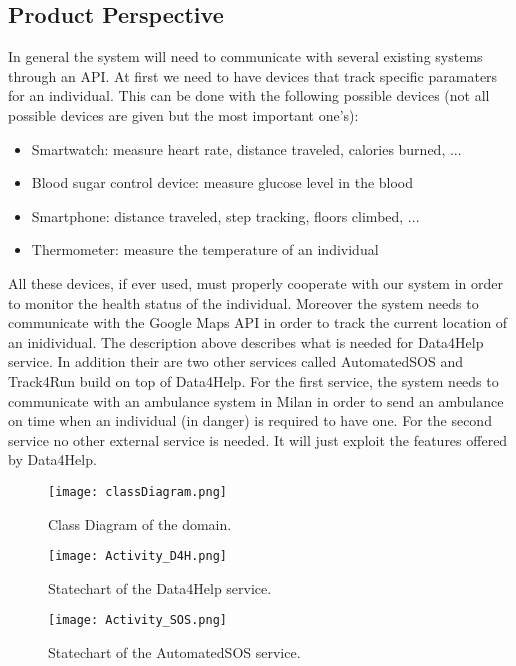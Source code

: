 \documentclass[12pt]{article}
\begin{document}
\subsection{Product Perspective}
In general the system will need to communicate with several existing systems through an API. At first we need to have devices that track specific paramaters for an individual. This can be done with the following possible devices (not all possible devices are given but the most important one's): 
\begin{itemize}
    \item Smartwatch: measure heart rate, distance traveled, calories burned, ...
    \item Blood sugar control device: measure glucose level in the blood
    \item Smartphone: distance traveled, step tracking, floors climbed, ...
    \item Thermometer: measure the temperature of an individual
\end{itemize}
All these devices, if ever used, must properly cooperate with our system in order to monitor the health status of the individual. Moreover the system needs to communicate with the Google Maps API in order to track the current location of an inidividual.
The description above describes what is needed for Data4Help service. In addition their are two other services called AutomatedSOS and Track4Run build on top of Data4Help. For the first service, the system needs to communicate with an ambulance system in Milan in order to send an ambulance on time when an individual (in danger) is required to have one. For the second service no other external service is needed. It will just exploit the features offered by Data4Help.

\begin{figure}[H]
\centering
\texttt{[image: classDiagram.png]}
\label{fig:ClassDiagram}
\caption{Class Diagram of the domain.}
\end{figure}
\newpage

\begin{figure}[H]
\centering
\texttt{[image: Activity\_D4H.png]}
\label{fig:Activity_D4H}
\caption{Statechart of the Data4Help service.}
\end{figure}

\begin{figure}[H]
\centering
\texttt{[image: Activity\_SOS.png]}
\label{fig:Activity_SOS}
\caption{Statechart of the AutomatedSOS service.}
\end{figure}
\end{document}
